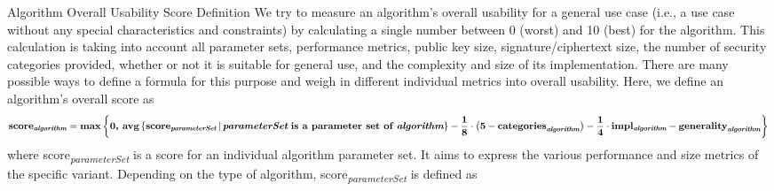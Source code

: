 


\vspace{-5mm}
\begin{algorithmbox}{Algorithm Overall Usability Score Definition}
	\tiny
	We try to measure an algorithm's overall usability for a general use case (i.e., a use case without any special characteristics and constraints) by calculating a single number between 0 (worst) and 10 (best) for the algorithm. This calculation is taking into account all parameter sets, performance metrics, public key size, signature/ciphertext size, the number of security categories provided, whether or not it is suitable for general use, and the complexity and size of its implementation. There are many possible ways to define a formula for this purpose and weigh in different individual metrics into overall usability. Here, we define an algorithm's overall score as
	\begin{align*}
		\textnormal{\bfseries score\textsubscript{\itshape \bfseries algorithm}} = \textnormal{\bfseries max}\left\{\textnormal{\bfseries 0, }\textnormal{\bfseries avg}\left\{\textnormal{\bfseries score}_\textnormal{\itshape \bfseries parameterSet}\,|\, \textnormal{{\itshape\bfseries  parameterSet} \bfseries is a parameter set of {\itshape algorithm}}\right\} - \frac{\textnormal{\bfseries 1}}{\textnormal{\bfseries 8}}\cdot\left(\textnormal{\bfseries 5}-\textnormal{\bfseries categories}_\textnormal{\itshape\bfseries  algorithm}\right) - \frac{\textnormal{\bfseries 1}}{\textnormal{\bfseries 4}}\cdot\textnormal{\bfseries impl\textsubscript{\itshape\bfseries algorithm}}- \textnormal{\bfseries generality}_\textnormal{\itshape\bfseries  algorithm}\right\}
	\end{align*}
	where \textnormal{score\textsubscript{\itshape parameterSet}} is a score for an individual algorithm parameter set. It aims to express the various performance and size metrics of the specific variant. Depending on the type of algorithm, \textnormal{score\textsubscript{\itshape parameterSet}} is defined as

\end{algorithmbox}
